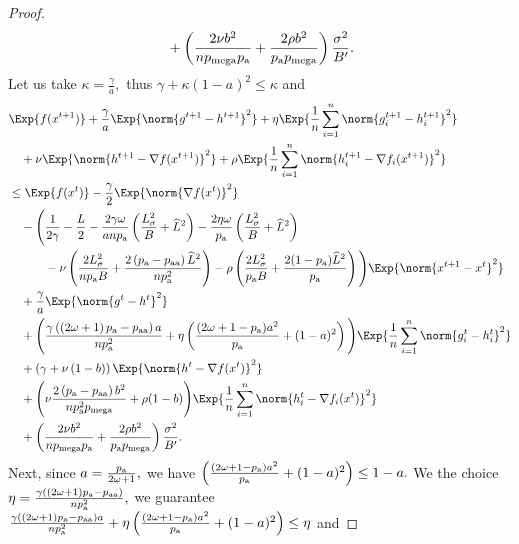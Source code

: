\documentclass{article}
\newcommand*{\probavailable}{\ensuremath{p_{\textnormal{a}}}}
\newcommand*{\probpairaa}{\ensuremath{p_{\textnormal{aa}}}}
\newcommand*{\probmega}{\ensuremath{p_{\text{mega}}}}
\begin{document}
\begin{proof}
\begin{align*}
    &\quad + \left(\frac{2 \nu b^2}{n \probmega \probavailable} + \frac{2 \rho b^2}{\probavailable \probmega}\right) \frac{\sigma^2}{B'}.
  \end{align*}
  Let us take $\kappa = \frac{\gamma}{a},$ thus $\gamma + \kappa \left(1 - a\right)^2 \leq \kappa$ and
  \begin{align*}
    &\Exp{f(x^{t + 1})} + \frac{\gamma}{a} \Exp{\norm{g^{t+1} - h^{t+1}}^2} + \eta \Exp{\frac{1}{n}\sum_{i=1}^n\norm{g^{t+1}_i - h^{t+1}_i}^2}\\
    &\quad  + \nu \Exp{\norm{h^{t+1} - \nabla f(x^{t+1})}^2} + \rho \Exp{\frac{1}{n}\sum_{i=1}^n\norm{h^{t+1}_i - \nabla f_i(x^{t+1})}^2}\\
    &\leq \Exp{f(x^t)} - \frac{\gamma}{2}\Exp{\norm{\nabla f(x^t)}^2} \\
    &\quad - \Bigg(\frac{1}{2\gamma} - \frac{L}{2} - \frac{2 \gamma \omega}{a n \probavailable}\left(\frac{L_{\sigma}^2}{B} + \widehat{L}^2\right) - \frac{2\eta \omega}{\probavailable} \left(\frac{L_{\sigma}^2}{B} + \widehat{L}^2\right) \\
    &\qquad\quad - \nu \left(\frac{2 L_{\sigma}^2}{n \probavailable B} + \frac{2\left(\probavailable - \probpairaa\right) \widehat{L}^2}{n \probavailable^2}\right) - \rho \left(\frac{2 L_{\sigma}^2}{\probavailable B} + \frac{2(1 - \probavailable) \widehat{L}^2}{\probavailable}\right)\Bigg) \Exp{\norm{x^{t+1} - x^t}^2} \\
    &\quad + \frac{\gamma}{a} \Exp{\norm{g^{t} - h^{t}}^2} \\
    &\quad + \Bigg( \frac{\gamma\left(\left(2 \omega + 1\right)\probavailable - \probpairaa\right)a}{n \probavailable^2} + \eta \left(\frac{(2\omega + 1 - \probavailable) a^2}{\probavailable} + (1 - a)^2\right)\Bigg)\Exp{\frac{1}{n}\sum_{i=1}^n\norm{g^{t}_i - h^{t}_i}^2} \\
    &\quad + \left(\gamma + \nu \left(1 - b\right)\right) \Exp{\norm{h^{t} - \nabla f(x^{t})}^2} \\
    &\quad + \Bigg(\nu \frac{2\left(\probavailable - \probpairaa\right) b^2}{n \probavailable^2 \probmega} + \rho (1 - b)\Bigg)\Exp{\frac{1}{n}\sum_{i=1}^n\norm{h^{t}_i - \nabla f_i(x^{t})}^2} \\
    &\quad + \left(\frac{2 \nu b^2}{n \probmega \probavailable} + \frac{2 \rho b^2}{\probavailable \probmega}\right) \frac{\sigma^2}{B'}.
  \end{align*}
  Next, since $a = \frac{\probavailable}{2\omega + 1},$ we have $\left(\frac{(2\omega + 1 - \probavailable) a^2}{\probavailable} + (1 - a)^2\right) \leq 1 - a.$ We the choice $\eta = \frac{\gamma\left(\left(2 \omega + 1\right)\probavailable - \probpairaa\right)}{n \probavailable^2},$ we guarantee $\frac{\gamma\left(\left(2 \omega + 1\right)\probavailable - \probpairaa\right)a}{n \probavailable^2} + \eta \left(\frac{(2\omega + 1 - \probavailable) a^2}{\probavailable} + (1 - a)^2\right) \leq \eta$ and 

\end{proof}
\end{document}
